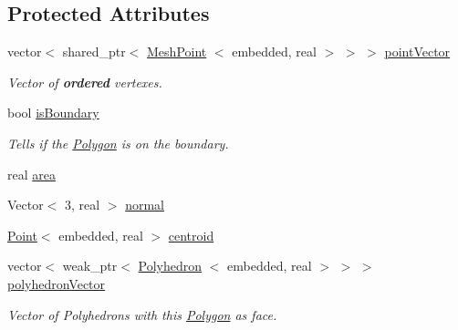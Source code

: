 \subsection*{\-Protected \-Attributes}
\begin{DoxyCompactItemize}
\item 
\hypertarget{class_polygon_a5869c5a0ffefb4afb44509fd9c611e7c}{vector$<$ shared\-\_\-ptr$<$ \hyperlink{class_mesh_point}{\-Mesh\-Point}\*
$<$ embedded, real $>$ $>$ $>$ \hyperlink{class_polygon_a5869c5a0ffefb4afb44509fd9c611e7c}{point\-Vector}}\label{class_polygon_a5869c5a0ffefb4afb44509fd9c611e7c}

\begin{DoxyCompactList}\small\item\em \-Vector of {\bfseries ordered} vertexes. \end{DoxyCompactList}\item 
\hypertarget{class_polygon_ac1f76ec494bfecbb4336ee908391d392}{bool \hyperlink{class_polygon_ac1f76ec494bfecbb4336ee908391d392}{is\-Boundary}}\label{class_polygon_ac1f76ec494bfecbb4336ee908391d392}

\begin{DoxyCompactList}\small\item\em \-Tells if the \hyperlink{class_polygon}{\-Polygon} is on the boundary. \end{DoxyCompactList}\item 
real \hyperlink{class_polygon_a97237c3271514d911648c249b3078842}{area}
\item 
\-Vector$<$ 3, real $>$ \hyperlink{class_polygon_a23acd35ab3af1494250f68fe733f2a1c}{normal}
\item 
\hyperlink{class_point}{\-Point}$<$ embedded, real $>$ \hyperlink{class_polygon_a26dc4392a659ca45b70410260e7c890d}{centroid}
\item 
vector$<$ weak\-\_\-ptr$<$ \hyperlink{class_polyhedron}{\-Polyhedron}\*
$<$ embedded, real $>$ $>$ $>$ \hyperlink{class_polygon_aac6777656621ccf17a4a6f144000cd56}{polyhedron\-Vector}
\begin{DoxyCompactList}\small\item\em \-Vector of \-Polyhedrons with this \hyperlink{class_polygon}{\-Polygon} as face. \end{DoxyCompactList}\end{DoxyCompactItemize}
